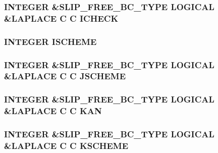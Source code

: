\hypertarget{flags_8com_a820fad8822140443f9e99a14c76dc711}{
\subsubsection[{I\-C\-H\-E\-C\-K}]{\setlength{\rightskip}{0pt plus 5cm}I\-N\-T\-E\-G\-E\-R \&{\bf S\-L\-I\-P\-\_\-\-F\-R\-E\-E\-\_\-\-B\-C\-\_\-\-T\-Y\-P\-E} L\-O\-G\-I\-C\-A\-L \&L\-A\-P\-L\-A\-C\-E C C I\-C\-H\-E\-C\-K}}\label{flags_8com_a820fad8822140443f9e99a14c76dc711}
\hypertarget{flags_8com_a2a5c33e10743241daf1d588271535cbd}{
\subsubsection[{I\-S\-C\-H\-E\-M\-E}]{\setlength{\rightskip}{0pt plus 5cm}I\-N\-T\-E\-G\-E\-R I\-S\-C\-H\-E\-M\-E}}\label{flags_8com_a2a5c33e10743241daf1d588271535cbd}
\hypertarget{flags_8com_a1083bd312818afd916c7d337fc2f522f}{
\subsubsection[{J\-S\-C\-H\-E\-M\-E}]{\setlength{\rightskip}{0pt plus 5cm}I\-N\-T\-E\-G\-E\-R \&{\bf S\-L\-I\-P\-\_\-\-F\-R\-E\-E\-\_\-\-B\-C\-\_\-\-T\-Y\-P\-E} L\-O\-G\-I\-C\-A\-L \&L\-A\-P\-L\-A\-C\-E C C J\-S\-C\-H\-E\-M\-E}}\label{flags_8com_a1083bd312818afd916c7d337fc2f522f}
\hypertarget{flags_8com_a8ba8c3e1746d1dda10a6169c712e8471}{
\subsubsection[{K\-A\-N}]{\setlength{\rightskip}{0pt plus 5cm}I\-N\-T\-E\-G\-E\-R \&{\bf S\-L\-I\-P\-\_\-\-F\-R\-E\-E\-\_\-\-B\-C\-\_\-\-T\-Y\-P\-E} L\-O\-G\-I\-C\-A\-L \&L\-A\-P\-L\-A\-C\-E C C K\-A\-N}}\label{flags_8com_a8ba8c3e1746d1dda10a6169c712e8471}
\hypertarget{flags_8com_adeb56587b709e4a5e4c069fc1212f8d4}{
\subsubsection[{K\-S\-C\-H\-E\-M\-E}]{\setlength{\rightskip}{0pt plus 5cm}I\-N\-T\-E\-G\-E\-R \&{\bf S\-L\-I\-P\-\_\-\-F\-R\-E\-E\-\_\-\-B\-C\-\_\-\-T\-Y\-P\-E} L\-O\-G\-I\-C\-A\-L \&L\-A\-P\-L\-A\-C\-E C C K\-S\-C\-H\-E\-M\-E}}\label{flags_8com_adeb56587b709e4a5e4c069fc1212f8d4}
